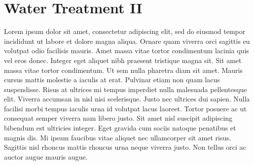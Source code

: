 
\chapter{Water Treatment II}



Lorem ipsum dolor sit amet, consectetur adipiscing elit, sed do eiusmod tempor incididunt ut labore et dolore magna aliqua. Ornare quam viverra orci sagittis eu volutpat odio facilisis mauris. Amet massa vitae tortor condimentum lacinia quis vel eros donec. Integer eget aliquet nibh praesent tristique magna sit. Sit amet massa vitae tortor condimentum. Ut sem nulla pharetra diam sit amet. Mauris cursus mattis molestie a iaculis at erat. Pulvinar etiam non quam lacus suspendisse. Risus at ultrices mi tempus imperdiet nulla malesuada pellentesque elit. Viverra accumsan in nisl nisi scelerisque. Justo nec ultrices dui sapien. Nulla facilisi morbi tempus iaculis urna id volutpat lacus laoreet. Tortor posuere ac ut consequat semper viverra nam libero justo. Sit amet nisl suscipit adipiscing bibendum est ultricies integer. Eget gravida cum sociis natoque penatibus et magnis dis. Mi ipsum faucibus vitae aliquet nec ullamcorper sit amet risus. Sagittis nisl rhoncus mattis rhoncus urna neque viverra justo. Non tellus orci ac auctor augue mauris augue.
